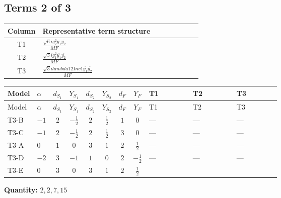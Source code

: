 \documentclass[8pt]{article}
\begin{document}
\begin{landscape}
\subsection*{Terms 2 of 3}
\begin{center}
\begin{tabular}{@{}c >{\raggedright\arraybackslash}p{0.82\linewidth}@{}}
\toprule
Column & Representative term structure \\
\midrule
T1 & \(\displaystyle \frac{\sqrt{6} i g_{2}^{2} \overline{y_{1}} \overline{y_{2}}}{MF}\) \\
\midrule
T2 & \(\displaystyle \frac{\sqrt{3} i g_{1}^{2} \overline{y_{1}} \overline{y_{2}}}{MF}\) \\
\midrule
T3 & \(\displaystyle \frac{\sqrt{3} i lambda12Inv1 \overline{y_{1}} \overline{y_{2}}}{MF}\) \\
\midrule
\bottomrule
\end{tabular}
\end{center}
\smallskip
\tiny
\begin{longtable}{@{}llcccccc >{\raggedright\arraybackslash}p{0.21\linewidth} >{\raggedright\arraybackslash}p{0.21\linewidth} >{\raggedright\arraybackslash}p{0.21\linewidth}@{}}
\toprule
Model & $\alpha$ & $d_{S_1}$ & $Y_{S_1}$ & $d_{S_2}$ & $Y_{S_2}$ & $d_F$ & $Y_F$ & T1 & T2 & T3 \\
\midrule
\endfirsthead
\toprule
Model & $\alpha$ & $d_{S_1}$ & $Y_{S_1}$ & $d_{S_2}$ & $Y_{S_2}$ & $d_F$ & $Y_F$ & T1 & T2 & T3 \\
\midrule
\endhead
T3-B & $-1$ & $2$ & $-\frac{1}{2}$ & $2$ & $\frac{1}{2}$ & $1$ & $0$ & --- & --- & --- \\
\midrule
T3-C & $-1$ & $2$ & $-\frac{1}{2}$ & $2$ & $\frac{1}{2}$ & $3$ & $0$ & --- & --- & --- \\
\midrule
T3-A & $0$ & $1$ & $0$ & $3$ & $1$ & $2$ & $\frac{1}{2}$ & --- & --- & --- \\
\midrule
T3-D & $-2$ & $3$ & $-1$ & $1$ & $0$ & $2$ & $-\frac{1}{2}$ & --- & --- & --- \\
\midrule
T3-E & $0$ & $3$ & $0$ & $3$ & $1$ & $2$ & $\frac{1}{2}$ & \scriptsize\adjustbox{max width=\linewidth}{$\begin{gathered} - \frac{\sqrt{6} i g_{2}^{2} \overline{y_{1}} \overline{y_{2}}}{3 MF}\end{gathered}$} & \scriptsize\adjustbox{max width=\linewidth}{$\begin{gathered} - \frac{\sqrt{3} i g_{1}^{2} \overline{y_{1}} \overline{y_{2}}}{8 MF}\end{gathered}$} & \scriptsize\adjustbox{max width=\linewidth}{$\begin{gathered} \frac{\sqrt{3} i lambda12Inv1 \overline{y_{1}} \overline{y_{2}}}{6 MF}\end{gathered}$} \\
\midrule
\bottomrule
\end{longtable}
\clearpage
\noindent\textbf{Quantity: }$\mathrm{2,2,7,15}$\par\smallskip

\end{landscape}
\end{document}
